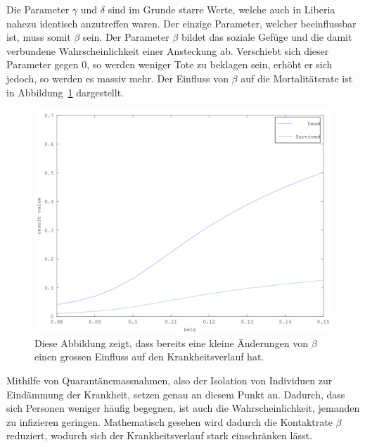 \begin{refsection}
Die Parameter $\gamma$ und $\delta$ sind im Grunde starre Werte, welche auch in Liberia nahezu identisch anzutreffen waren. Der einzige Parameter, welcher beeinflussbar ist, muss somit $\beta$ sein. Der Parameter $\beta$ bildet das soziale Gefüge und die damit verbundene Wahrscheinlichkeit einer Ansteckung ab. Verschiebt sich dieser Parameter gegen 0, so werden weniger Tote zu beklagen sein, erhöht er sich jedoch, so werden es massiv mehr. Der Einfluss von $\beta$ auf die Mortalitätsrate ist in Abbildung~\ref{fig:beta_change_det} dargestellt.

\begin{figure}[ht]
	\centering
	\includegraphics[width=.8\textwidth]{sir/images/beta_change_det}
  \caption[Einfluss von $\beta$ auf die Mortalitätsrate]{Diese Abbildung zeigt, dass bereits eine kleine Änderungen von $\beta$ einen grossen Einfluss auf den Krankheitsverlauf hat.}
  \label{fig:beta_change_det}
\end{figure}

Mithilfe von Quarantänemassnahmen, also der Isolation von Individuen zur Eindämmung der Krankheit, setzen genau an diesem Punkt an. Dadurch, dass sich Personen weniger häufig begegnen, ist auch die Wahrscheinlichkeit, jemanden zu infizieren geringen. 
Mathematisch gesehen wird dadurch die Kontaktrate $\beta$ reduziert, wodurch sich der Krankheitsverlauf stark einschränken lässt.


\end{refsection}
